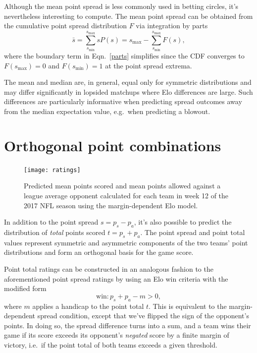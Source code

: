 \documentclass[aps,prc,reprint,amsmath,superscriptaddress,nofootinbib]{revtex4-1}
\begin{document}
Although the mean point spread is less commonly used in betting circles, it's nevertheless interesting to compute.
The mean point spread can be obtained from the cumulative point spread distribution $F$ via integration by parts
\begin{equation}
  \label{parts}
  \bar{s} = \sum\limits_{s_\text{min}}^{s_\text{max}} s P(s) = s_\text{max} - \sum\limits_{s_\text{min}}^{s_\text{max}} F(s),
\end{equation}
where the boundary term in Eqn.~\eqref{parts} simplifies since the CDF converges to $F(s_\text{max})=0$ and $F(s_\text{min})=1$ at the point spread extrema.

The mean and median are, in general, equal only for symmetric distributions and may differ significantly in lopsided matchups where Elo differences are large.
Such differences are particularly informative when predicting spread outcomes away from the median expectation value, e.g.\ when predicting a blowout. 

\section{Orthogonal point combinations}

\begin{figure}
  \texttt{[image: ratings]}
  \caption{\label{fig:ratings} Predicted mean points scored and mean points allowed against a league average opponent calculated for each team in week 12 of the 2017 NFL season using the margin-dependent Elo model.}
\end{figure}

In addition to the point spread $s = p_s - p_a$, it's also possible to predict the distribution of \emph{total} points scored $t = p_s + p_a$.
The point spread and point total values represent symmetric and asymmetric components of the two teams' point distributions and form an orthogonal basis for the game score. 

Point total ratings can be constructed in an analogous fashion to the aforementioned point spread ratings by using an Elo win criteria with the modified form
\begin{equation}
  \label{win_total}
  \text{win}: p_s + p_a - m > 0,
\end{equation}
where $m$ applies a handicap to the point total $t$.
This is equivalent to the margin-dependent spread condition, except that we've flipped the sign of the opponent's points.
In doing so, the spread difference turns into a sum, and a team wins their game if its score exceeds its opponent's \emph{negated} score by a finite margin of victory, i.e.\ if the point total of both teams exceeds a given threshold.
\end{document}
